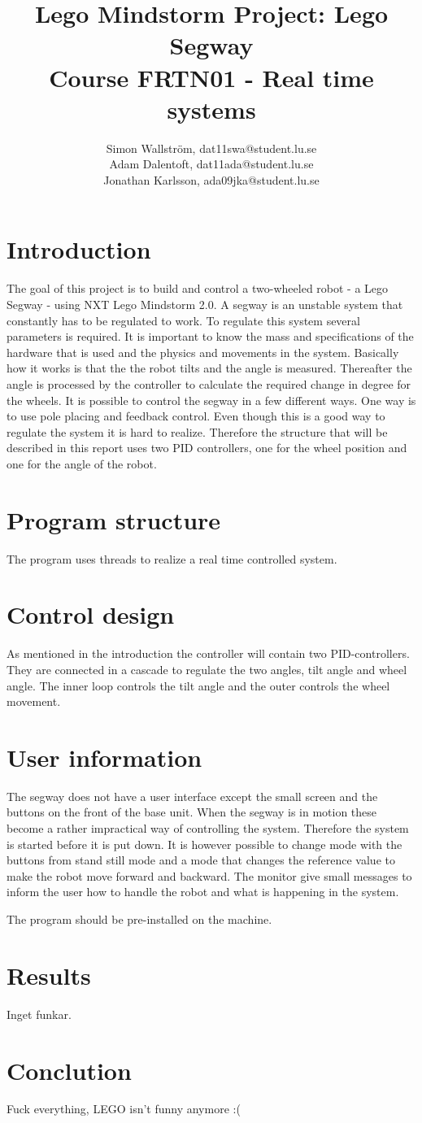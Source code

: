 \documentclass[a4paper]{article}
\title{Lego Mindstorm Project: Lego Segway\\
Course FRTN01 - Real time systems}
\author{Simon Wallström, dat11swa@student.lu.se\\
Adam Dalentoft, dat11ada@student.lu.se\\
Jonathan Karlsson, ada09jka@student.lu.se}
\begin{document}

\maketitle
\thispagestyle{empty}
\newpage
\setcounter{page}{1}
\tableofcontents
\newpage
\section{Introduction}
The goal of this project is to build and control a two-wheeled robot - a Lego Segway - using NXT Lego Mindstorm 2.0. A segway is an unstable system that constantly has to be regulated to work. To regulate this system several parameters is required. It is important to know the mass and specifications of the hardware that is used and the physics and movements in the system. Basically how it works is that the the robot tilts and the angle is measured. Thereafter the angle is processed by the controller to calculate the required change in degree for the wheels. It is possible to control the segway in a few different ways. One way is to use pole placing and feedback control. Even though this is a good way to regulate the system it is hard to realize. Therefore the structure that will be described in this report uses two PID controllers, one for the wheel position and one for the angle of the robot.


\section{Program structure}
The program uses threads to realize a real time controlled system. 


\section{Control design}
As mentioned in the introduction the controller will contain two PID-controllers. They are connected in a cascade to regulate the two angles, tilt angle and wheel angle. The inner loop controls the tilt angle and the outer controls the wheel movement. 

\section{User information}
The segway does not have a user interface except the small screen and the buttons on the front of the base unit. When the segway is in motion these become a rather impractical way of controlling the system. Therefore the system is started before it is put down. It is however possible to change mode with the buttons from stand still mode and a mode that changes the reference value to make the robot move forward and backward. The monitor give small messages to inform the user how to handle the robot and what is happening in the system.

The program should be pre-installed on the machine.

\section{Results}
Inget funkar.


\section{Conclution}
Fuck everything, LEGO isn’t funny anymore :(
\end{document}
